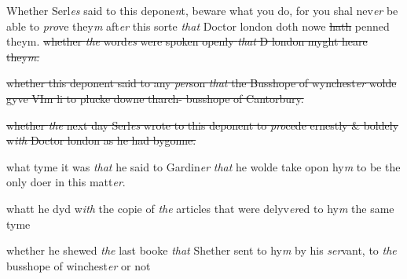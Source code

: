 \documentclass[12pt, a4paper]{book}
\begin{document}
		\ifthenelse{\isodd{\thepage}}
		{\reversemarginpar}
		{\normalmarginpar}
		 Whether Serl\textit{es} said to this depone\textit{n}t, beware what
 you do, for you shal nev\textit{er} be able to \textit{pro}ve they\textit{m} aft\textit{er} this
 sorte \textit{that} Doctor london doth nowe
			 \sout{hath} penned theym.
	\sout{whether \textit{the} word\textit{es} were spoken openly \textit{that} D london
 myght heare they\textit{m}.}
 


	
			
	
		\ifthenelse{\isodd{\thepage}}
		{\reversemarginpar}
		{\normalmarginpar}
		\sout{whether this deponent said to any \textit{per}son \textit{that} the Busshope
		of wynchest\textit{er} wolde gyve VIm li to plucke downe tharch- 
			busshope of Cantorbury.}


	
			
	
		\ifthenelse{\isodd{\thepage}}
		{\reversemarginpar}
		{\normalmarginpar}
		\sout{whether \textit{the} next day Serl\textit{es} wrote to this deponent
 to \textit{pro}cede ernestly \& boldely w\textit{ith} Doctor london as he had
 bygonne.}


	
			
	
		\ifthenelse{\isodd{\thepage}}
		{\reversemarginpar}
		{\normalmarginpar}
		 what tyme it was \textit{that} he said to Gardin\textit{er} \textit{that} he wolde
 take opon hy\textit{m} to be the only doer in this matt\textit{er}.
 



			

		\ifthenelse{\isodd{\thepage}}
		{\reversemarginpar}
		{\normalmarginpar}
		 whatt he dyd w\textit{ith} the copie of \textit{the} articles that were
 delyv\textit{er}ed to hy\textit{m} the same tyme
 



			

		\ifthenelse{\isodd{\thepage}}
		{\reversemarginpar}
		{\normalmarginpar}
		 whether he shewed \textit{the} last booke \textit{that} Shether sent
	to hy\textit{m} by his \textit{ser}vant, to \textit{the} busshope of winchest\textit{er} or not
\end{document}
